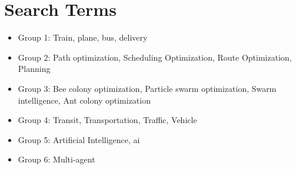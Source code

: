 \section{Search Terms}

\begin{itemize}

\item Group 1: Train, plane, bus, delivery
\item Group 2: Path optimization, Scheduling Optimization, Route Optimization, Planning
\item Group 3: Bee colony optimization, Particle swarm optimization, Swarm intelligence, Ant colony optimization
\item Group 4: Transit, Transportation, Traffic, Vehicle
\item Group 5: Artificial Intelligence, ai
\item Group 6: Multi-agent

\end{itemize}